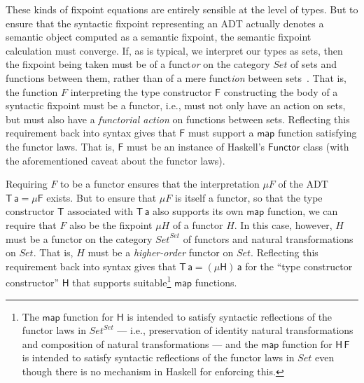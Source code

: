 \documentclass[submission,copyright,creativecommons]{eptcs}
\begin{document}
These kinds of fixpoint equations are entirely sensible at the level
of types. But to ensure that the syntactic fixpoint representing an
ADT actually denotes a semantic object computed as a semantic
fixpoint, the semantic fixpoint calculation must converge.  If, as is
typical, we interpret our types as sets, then the fixpoint being taken
must be of a funct{\em or} on the category $\mathit{Set}$ of sets and
functions between them, rather than of a mere funct{\em ion} between
sets~\cite{tfca}.  That is, the function $F$ interpreting the type
constructor $\mathsf{F}$ constructing the body of a syntactic fixpoint
must be a functor, i.e., must not only have an action on sets, but
must also have a {\em functorial action} on functions between
sets. Reflecting this requirement back into syntax gives that
$\mathsf{F}$ must support a
$\mathsf{map}$ function satisfying the functor laws. That is,
$\mathsf{F}$ must be an instance of Haskell's $\mathsf{Functor}$ class
(with the aforementioned caveat about the functor laws).

Requiring $F$ to be a functor ensures that the interpretation $\mu F$
of the ADT $\mathsf{T\,a} = \mathsf{\mu F}$ exists. But to ensure that
$\mu F$ is itself a functor, so that the type constructor $\mathsf{T}$
associated with $\mathsf{T\,a}$ also supports its own $\mathsf{map}$
function, we can require that $F$ also be the fixpoint $\mu H$ of a
functor $H$. In this case, however, $H$ must be a functor on the
category $\mathit{Set}^\mathit{Set}$ of functors and natural
transformations on $\mathit{Set}$. That is, $H$ must be a {\em
  higher-order} functor on $\mathit{Set}$. Reflecting this requirement
back into syntax gives that $\mathsf{T\,a} = \mathsf{(\mu H)\,a}$ for
the ``type constructor constructor'' $\mathsf{H}$ that supports
suitable\footnote{The $\mathsf{map}$ function for $\mathsf{H}$ is
  intended to satisfy syntactic reflections of the functor laws in
  $\mathit{Set}^\mathit{Set}$ --- i.e., preservation of identity
  natural transformations and composition of natural transformations
  --- and the $\mathsf{map}$ function for $\mathsf{H\,F}$ is intended
  to satisfy syntactic reflections of the functor laws in
  $\mathit{Set}$ even though there is no mechanism in Haskell for
  enforcing this.} $\mathsf{map}$ functions.
\end{document}

